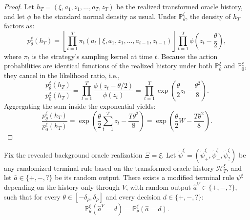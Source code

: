 \documentclass[10pt]{article}
\theoremstyle{plain}
\begin{document}
\begin{proof}
Let $h_T=(\xi,a_1,z_1,\dots,a_T,z_T)$ be the realized transformed oracle history, and let $\phi$ be the standard normal density as usual. Under $\mathbb{P}_\theta^{\xi}$, the density of $h_T$ factors as:
$$p_\theta^{\xi}(h_T)=\left[\prod_{t=1}^T\pi_t(a_t\mid \xi,a_1,z_1,\dots,a_{t-1},z_{t-1})\right]\prod_{t=1}^T\phi\!\left(z_t-\frac{\theta}{2}\right),$$
where $\pi_t$ is the strategy's sampling kernel at time $t$. Because the action probabilities are identical functions of the realized history under both $\mathbb{P}_\theta^{\xi}$ and $\mathbb{P}_0^{\xi}$, they cancel   in the likelihood ratio, i.e., 
$$\frac{p_\theta^{\xi}(h_T)}{p_0^{\xi}(h_T)}=\prod_{t=1}^T\frac{\phi(z_t-\theta/2)}{\phi(z_t)}=\prod_{t=1}^T\exp\!\left(\frac{\theta}{2}z_t-\frac{\theta^2}{8}\right).$$
Aggregating the sum inside the exponential yields:
$$\frac{p_\theta^{\xi}(h_T)}{p_0^{\xi}(h_T)}=\exp\!\left(\frac{\theta}{2}\sum_{t=1}^T z_t-\frac{T\theta^2}{8}\right)=\exp\!\left(\frac{\theta}{2}W-\frac{T\theta^2}{8}\right).  $$

\end{proof}




\begin{lemma}
\label{lem:local-reduce-to-V}
Fix the revealed background oracle realization $\Xi=\xi$. Let $\tilde{\psi}^\xi = (\tilde{\psi}_+^\xi, \tilde{\psi}_-^\xi, \tilde{\psi}_?^\xi)$ be any randomized terminal rule based on the transformed oracle history $\mathcal{H}_T^{\xi}$, and let $\hat{a} \in \{+,-,?\}$ be its random output. There exists a modified terminal rule $\psi^\xi$ depending on the history only through $V$, with random output $\hat{a}^V \in \{+,-,?\}$, such that for every $\theta\in[-\delta_{\rho},\delta_{\rho}]$ and every decision $d\in\{+,-,?\}$:
$$ \mathbb{P}_\theta^{\xi}(\hat{a}^V=d) = \mathbb{P}_\theta^{\xi}(\hat{a}=d). $$
\end{lemma}
\end{document}

